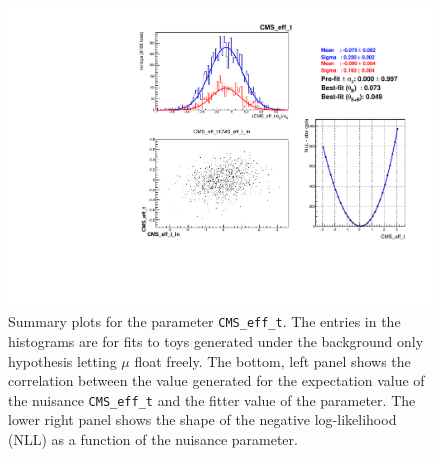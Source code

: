 \begin{figure}[hbtp]
  \begin{center}
    \includegraphics[width=\textwidth]{combinations/diagnostics/tree_fit_sb_CMS_eff_t.pdf}
    \caption{Summary plots for the parameter \texttt{CMS\_eff\_t}. 
	The entries in the histograms are for fits to toys generated under the background only
	hypothesis letting $\mu$ float freely. The bottom, left panel shows the correlation
	between the value generated for the expectation value of the nuisance \texttt{CMS\_eff\_t} 
	and the fitter value of the parameter. The lower right panel shows the shape of the 
	negative log-likelihood (NLL) as a function of the nuisance parameter.}
    \label{fig:combination_cmsefft}
  \end{center}
\end{figure}
